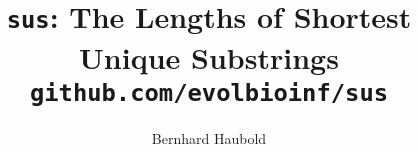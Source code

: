 \documentclass[a4paper]{article}
\begin{document}
\pagestyle{noweb}

\title{\texttt{sus}: The Lengths of Shortest Unique Substrings\\
\small \texttt{github.com/evolbioinf/sus}}
\author{Bernhard Haubold}
\maketitle
\tableofcontents




\end{document}

